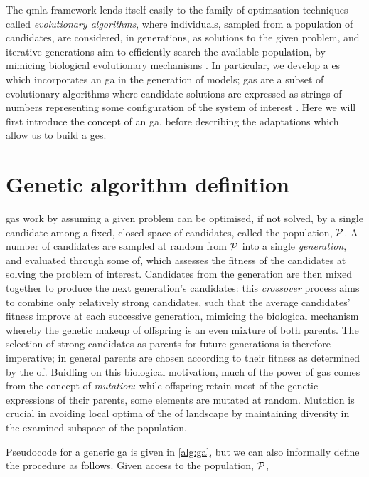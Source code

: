 The \gls{qmla} framework lends itself easily to the family of optimsation techniques called \emph{evolutionary algorithms}, 
    where individuals, sampled from a population of candidates, are considered, in generations, as solutions to the given problem,
    and iterative generations aim to efficiently search the available population, 
    by mimicing biological evolutionary mechanisms \cite{back1996evolutionary}. 
In particular, we develop a \gls{es} which incorporates an \gls{ga} in the generation of models;
    \glspl{ga} are a subset of evolutionary algorithms where candidate solutions are expressed as 
    strings of numbers representing some configuration of the system of interest \cite{holland1992adaptation}.
Here we will first introduce the concept of an \gls{ga}, before describing the adaptations which allow us to 
    build a \gls{ges}. 

\section{Genetic algorithm definition}
\glspl{ga} work by assuming a given problem can be optimised, if not solved, by a single candidate 
    among a fixed, closed space of candidates, called the population, $\mathcal{P}$. 
A number of candidates are sampled at random from $\mathcal{P}$ into a single \emph{generation}, 
    and evaluated through some \gls{of}, which assesses the fitness of the candidates at solving the problem of interest. 
Candidates from the generation are then mixed together to produce the next generation's candidates: 
    this \emph{crossover} process aims to combine only relatively strong candidates, such that the average 
    candidates' fitness improve at each successive generation, 
    mimicing the biological mechanism whereby the genetic makeup of offspring is an even mixture of both parents. 
The selection of strong candidates as parents for future generations is therefore imperative; 
    in general parents are chosen according to their fitness as determined by the \gls{of}. 
Buidling on this biological motivation, much of the power of \glspl{ga} comes from the concept of \emph{mutation}: 
    while offspring retain most of the genetic expressions of their parents, some elements are mutated at random.
Mutation is crucial in avoiding local optima of the \gls{of} landscape
    by maintaining diversity in the examined subspace of the population.
\par 

Pseudocode for a generic \gls{ga} is given in \cref{alg:ga},
    but we can also informally define the procedure as follows. 
Given access to the population, $\mathcal{P}$, 

